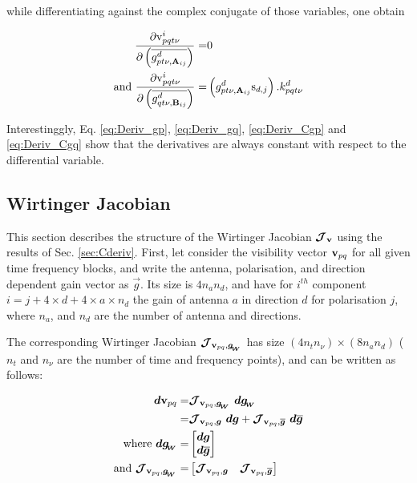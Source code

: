 \noindent while differentiating against the complex conjugate of those
variables, one obtain

\begin{alignat}{3}
\label{eq:Deriv_Cgp}
\frac{\partial \mathrm{v}^i_{pqt\nu}}{\partial \conjp{g^{d}_{pt\nu,\textbf{A}_{ij}}}}=&0\\
\label{eq:Deriv_Cgq}
\text{and}\ 
\frac{\partial \mathrm{v}^i_{pqt\nu}}{\partial \conjp{g^{d}_{qt\nu,\textbf{B}_{ij}}}}=&
\left(g^{d}_{pt\nu,\textbf{A}_{ij}}\text{s}_{d,j}\right).k^{d}_{pqt\nu}
\end{alignat}

Interestinggly, Eq. \ref{eq:Deriv_gp},
\ref{eq:Deriv_gq}, \ref{eq:Deriv_Cgp} and \ref{eq:Deriv_Cgq} show that the
derivatives are always constant with respect to the differential
variable.

\subsection{Wirtinger Jacobian}
\label{sec:WirtingerJacob}

This section describes the structure of the Wirtinger Jacobian $\bm{\mathcal{J}}_{\textbf{v}}$ using the
results of Sec. \ref{sec:Cderiv}.
First, let consider the visibility vector $\textbf{v}_{pq}$
for all given time frequency blocks, and write the antenna,
polarisation, and direction dependent gain vector as
$\vec{g}$. Its size is $4n_an_d$, and have for $i^{th}$ component
$i=j+4\times d+4\times a \times n_d$ the gain of antenna $a$ in
direction $d$ for polarisation $j$, where $n_a$, and $n_d$ are the
number of antenna and directions.

The corresponding Wirtinger Jacobian $\bm{\mathcal{J}}_{{\textbf{v}_{pq}},\bm{g_{\!_{W}}}}$ has size $(4n_t n_{\nu})\times (8n_a n_d)$ ($n_t$
and $n_{\nu}$ are the number of time and frequency points), and can be
written as follows:

\begin{alignat}{2}
\label{eq:dV}
\dbf\vbl=&\JVpq\ \dbf\gwirt\\
=&\JVpqg\ \dbf\g+\JVpqCg\ \dbf\conj{\g}\\
\text{where }\dgwirt=&
\begin{bmatrix}
\dbf\vec{g}\\
\dbf\conj{\vec{g}}
\end{bmatrix}\\
\text{and }\JVpq=&
\begin{bmatrix}
\JVpqg & \JVpqCg
\end{bmatrix}
\end{alignat}

